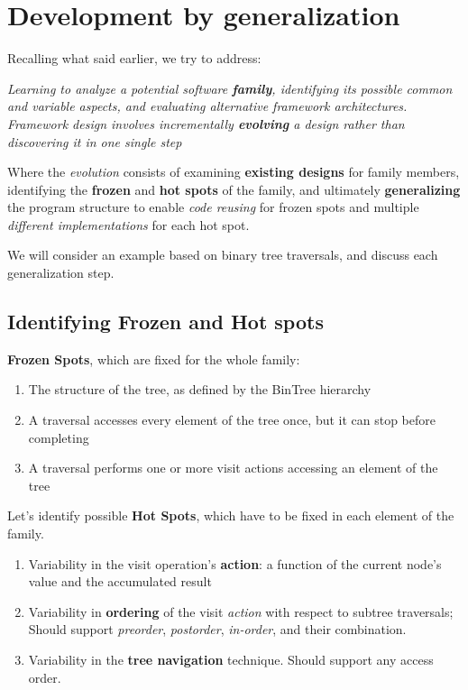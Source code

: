 \section{Development by generalization}

Recalling what said earlier, we try to address:
\begin{center}
   \textit{Learning to analyze a potential software \textbf{family}, identifying its
   possible common and variable aspects, and evaluating
   alternative framework architectures. Framework design involves
   incrementally \textbf{evolving} a design rather than discovering it in one
   single step}
\end{center}

Where the \emph{evolution} consists of examining \textbf{existing designs} for family members, identifying the \textbf{frozen} and \textbf{hot spots} of the family, and ultimately \textbf{generalizing} the program structure to enable \textit{code reusing} for frozen spots and
multiple \textit{different implementations} for each hot spot.

We will consider an example based on binary tree traversals, and discuss each generalization step.

\subsection{Identifying Frozen and Hot spots}
\textbf{Frozen Spots}, which are fixed for the whole family:
\begin{enumerate}
   \item The structure of the tree, as defined by the
   BinTree hierarchy
   \item A traversal accesses every element of the tree
   once, but it can stop before completing
   \item A traversal performs one or more visit actions
   accessing an element of the tree
\end{enumerate}

Let's identify possible \textbf{Hot Spots}, which have to be fixed in each element of the family.
\begin{enumerate}
   \item Variability in the visit operation’s \textbf{action}:
   a function of the current node’s value and the accumulated result
   \item Variability in \textbf{ordering} of the visit \textit{action} with respect to subtree traversals;
   Should support \textit{preorder},
   \textit{postorder}, \textit{in-order}, and their combination.
   \item Variability in the \textbf{tree navigation} technique. 
   Should support any access order.
\end{enumerate}

